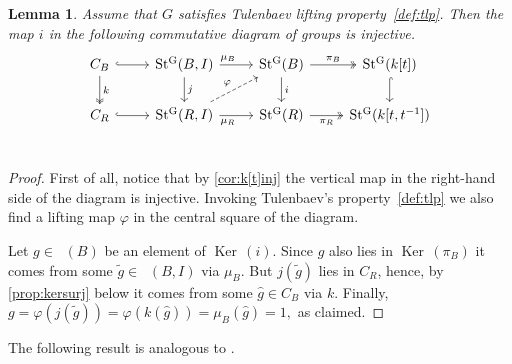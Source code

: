 \documentclass[oneside,12pt]{amsart}
\numberwithin{equation}{section}
\newtheorem{lem}{Lemma}
\numberwithin{lem}{section}
\theoremstyle{definition}
\theoremstyle{remark}
\DeclareMathOperator{\St}{St^G}
\DeclareMathOperator{\Bigker}{Ker\,}
\begin{document}
\begin{lem} \label{lem:tulinj} Assume that $G$ satisfies Tulenbaev lifting property~\ref{def:tlp}. 
Then the map $i$ in the following commutative diagram of groups is injective.
\begin{equation} \label{diag:cs} \begin{tikzcd} 
C_{B} \ar[r, hookrightarrow] \ar[d, "k", twoheadrightarrow] & \St(B, I) \ar[r, "\mu_B" near start] \ar[d, "j"] & \ar[d, "i"] \St(B) \ar[r, "\pi_B", twoheadrightarrow] & \St(k[t]) \ar[d, hookrightarrow] \\     
C_{R} \ar[r, hookrightarrow]                                & \St(R, I) \ar[ur, dashrightarrow, "\varphi"] \ar[r, "\mu_R"' near start] & \St(R) \ar[r, "\pi_R"', twoheadrightarrow] & \St(k[t, t^{-1}]) \\ \end{tikzcd} \end{equation} \end{lem}
\begin{proof} First of all, notice that by \cref{cor:k[t]inj} the vertical map in the right-hand side of the diagram is injective.
 Invoking Tulenbaev's property~\ref{def:tlp} we also find a lifting map $\varphi$ in the central square of the diagram.

 Let $g \in \St(B)$ be an element of $\Bigker(i)$.
 Since $g$ also lies in $\Bigker(\pi_B)$ it comes from some $\widetilde{g} \in \St(B, I)$ via $\mu_B$.
 But $j(\widetilde{g})$ lies in $C_R$, hence, by \cref{prop:kersurj} below it comes from some $\widehat{g} \in C_B$ via $k$.
 Finally, $g = \varphi(j(\widetilde{g})) = \varphi(k(\widehat{g})) = \mu_B(\widehat{g}) = 1,$ as claimed. \end{proof}

The following result is analogous to \cite[Proposition~4.1]{Tu}.
\end{document}
